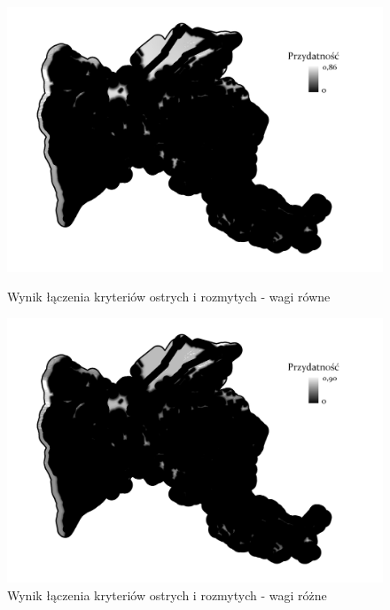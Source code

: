 \documentclass{article}
\begin{document}
\begin{figure}[H]
    \begin{minipage}[t]{0.48\textwidth}
        \centering
        \includegraphics[width=\linewidth]{img/wynik.jpg}
        \caption{Wynik łączenia kryteriów ostrych i rozmytych - wagi równe}
        \label{fig:wynik-rowne}
    \end{minipage}
    \hfill
    \begin{minipage}[t]{0.48\textwidth}
        \centering
        \includegraphics[width=\linewidth]{img/roznewagi-wynik.jpg}
        \caption{Wynik łączenia kryteriów ostrych i rozmytych - wagi różne}
        \label{fig:wynik-rozne}
    \end{minipage}
\end{figure}

\vspace{10pt}
\end{document}
